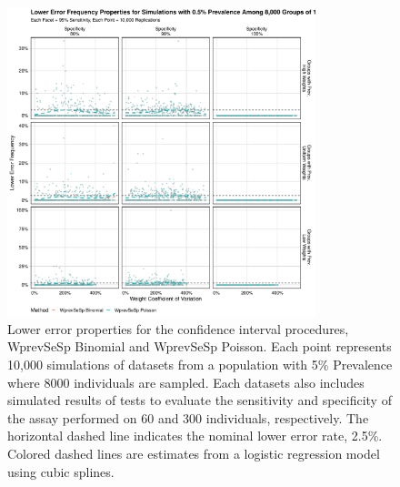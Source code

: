 \documentclass[AMA,STIX1COL]{WileyNJD-v2}
\begin{document}
\begin{figure}
\centering
\includegraphics[width=0.8\textwidth]{figures/imperfect_lower_error_frequency_8000_groups_0_005_prev.pdf}
\caption{Lower error properties for the confidence interval procedures, WprevSeSp Binomial and WprevSeSp Poisson.
Each point represents 10,000 simulations of datasets from a population with 5\% Prevalence where 8000 individuals are sampled.
Each datasets also includes simulated results of tests to evaluate the sensitivity and specificity of the assay performed on 60 and 300 individuals, respectively.
The horizontal dashed line indicates the nominal lower error rate, 2.5\%.
Colored dashed lines are estimates from a logistic regression model using cubic splines.}
\label{fig:imperfect_lower_error_frequency_8000_groups_0_005_prev}
\end{figure}
\end{document}
